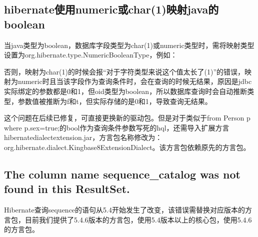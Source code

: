 \documentclass[letterpaper,10pt,english]{sphinxmanual}
\begin{document}
\begin{sphinxVerbatim}[commandchars=\\\{\}]
 
\end{sphinxVerbatim}


\subsection{hibernate使用numeric或char(1)映射java的boolean}
\label{\detokenize{interface/hibernate:hibernatenumericchar-1-javaboolean}}
当java类型为boolean，数据库字段类型为char(1)或numeric类型时，需将映射类型设置为org.hibernate.type.NumericBooleanType，例如：

\begin{sphinxVerbatim}[commandchars=\\\{\}]
  
          
\end{sphinxVerbatim}

否则，映射为char(1)的时候会报“对于字符类型来说这个值太长了(1)”的错误，映射为numeric时且当该字段作为查询条件时，会在查询的时候无结果，原因是jdbc实际绑定的参数都是0和1，但oid类型为boolean，所以数据库查询时会自动推断类型，参数值被推断为f和t，但实际存储的是0和1，导致查询无结果。

这个问题在后续已修复，可直接更换新的驱动包。但是对于类似于from Person p where p.sex=true;的bool作为查询条件参数写死的hql，还需导入扩展方言hibernate\sphinxhyphen{}dialect\sphinxhyphen{}extension.jar，方言包名称修改为：org.hibernate.dialect.Kingbase8ExtensionDialect。该方言包依赖原先的方言包。


\subsection{The column name sequence\_catalog was not found in this ResultSet.}
\label{\detokenize{interface/hibernate:the-column-name-sequence-catalog-was-not-found-in-this-resultset}}
Hibernate查询sequence的语句从5.4开始发生了改变，该错误需替换对应版本的方言包，目前我们提供了5.4.6版本的方言包，使用5.4版本以上的核心包，使用5.4.6的方言包。
\end{document}
